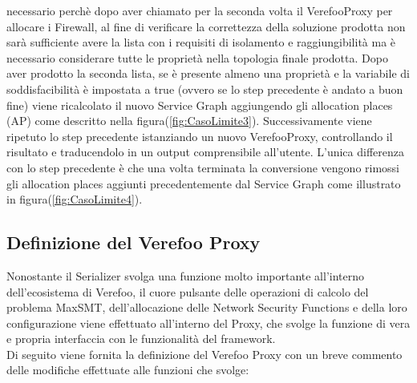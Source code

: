 necessario perchè dopo aver chiamato per la seconda volta il VerefooProxy per allocare i Firewall, al fine di verificare la correttezza della soluzione prodotta non sarà sufficiente avere la lista
con i requisiti di isolamento e raggiungibilità ma è necessario considerare tutte le proprietà nella topologia finale prodotta. Dopo aver prodotto la seconda lista, se è presente almeno una proprietà 
e la variabile di soddisfacibilità è impostata a true (ovvero se lo step precedente è andato a buon fine) viene ricalcolato il nuovo Service Graph aggiungendo gli allocation places (AP) come descritto nella figura(\ref{fig:CasoLimite3}).
Successivamente viene ripetuto lo step precedente istanziando un nuovo VerefooProxy, controllando il risultato e traducendolo in un output comprensibile all'utente. L'unica differenza con lo step precedente è che una volta terminata la conversione vengono rimossi
gli allocation places aggiunti precedentemente dal Service Graph come illustrato in figura(\ref{fig:CasoLimite4}).
    
\subsection{Definizione del Verefoo Proxy}
Nonostante il Serializer svolga una funzione molto importante all'interno dell'ecosistema di Verefoo, il cuore pulsante delle operazioni di calcolo del problema MaxSMT, dell'allocazione delle Network Security Functions e della loro configurazione viene effettuato
all'interno del Proxy, che svolge la funzione di vera e propria interfaccia con le funzionalità del framework.\\
Di seguito viene fornita la definizione del Verefoo Proxy con un breve commento delle modifiche effettuate alle funzioni che svolge:

